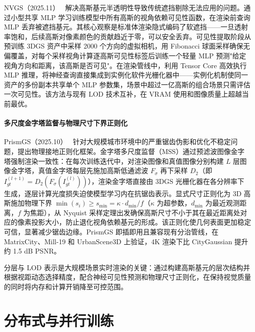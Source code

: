 NVGS（2025.11）~\cite{2511_19202} 解决高斯基元半透明性导致传统遮挡剔除无法应用的问题。通过小型共享 MLP 学习训练模型中所有高斯的视角依赖可见性函数，在渲染前查询 MLP 丢弃被遮挡基元。其核心观察是标准体渲染隐式编码了软遮挡——一旦透射率饱和，后续高斯对像素颜色的贡献趋近于零，可以安全丢弃。可见性提取阶段从预训练 3DGS 资产中采样 2000 个方向的虚拟相机，用 Fibonacci 球面采样确保无偏覆盖，对每个采样视角计算逐高斯可见性标签后训练一个轻量 MLP 预测"给定视角方向和距离，该高斯是否可见"。在渲染管线中，利用 Tensor Core 高效执行 MLP 推理，将神经查询直接集成到实例化软件光栅化器中——实例化机制使同一资产的多份副本共享单个 MLP 参数集，场景中超过一亿高斯的组合场景只需评估一次可见性。该方法与现有 LOD 技术互补，在 VRAM 使用和图像质量上超越当前最优。

\paragraph{多尺度金字塔监督与物理尺寸下界正则化}

PrismGS（2025.10）~\cite{2510_07830} 针对大规模城市环境中的严重锯齿伪影和优化不稳定问题，提出物理接地正则化框架。金字塔多尺度监督（MSS）通过预滤波图像金字塔强制渲染一致性：在每次训练迭代中，对渲染图像和真值图像分别构建 $L$ 层图像金字塔，真值金字塔每层先施加高斯低通滤波 $F_\sigma$ 再下采样 $D_2$（即 $I_{gt}^{(l+1)} = D_2(F_\sigma(I_{gt}^{(l)}))$），渲染金字塔直接由 3DGS 光栅化器在各分辨率下生成，逐层计算光度损失迫使模型学习内在抗锯齿表示。显式尺寸正则化为 3D 高斯施加物理下界 $\min(s_i) \geq s_{\min} = \kappa \cdot d_{\min} / f$（$\kappa$ 为超参数，$d_{\min}$ 为最近观测距离，$f$ 为焦距），从 Nyquist 采样定理出发确保高斯尺寸不小于其在最近距离处对应的像素投影大小，防止退化视角依赖基元的形成。该正则化使几何表面更加稳定可信，显著减少锯齿边缘。PrismGS 即插即用且兼容现有分治管线，在 MatrixCity、Mill-19 和 UrbanScene3D 上验证，4K 渲染下比 CityGaussian 提升约 1.5 dB PSNR。

\begin{takeaway}
分层与 LOD 表示是大规模场景实时渲染的关键：通过构建高斯基元的层次结构并根据视距动态选择精度，配合神经可见性预测和物理尺寸正则化，在保持视觉质量的同时将内存和计算开销降至可控范围。
\end{takeaway}



\section{分布式与并行训练}
\label{sec:14_4}

